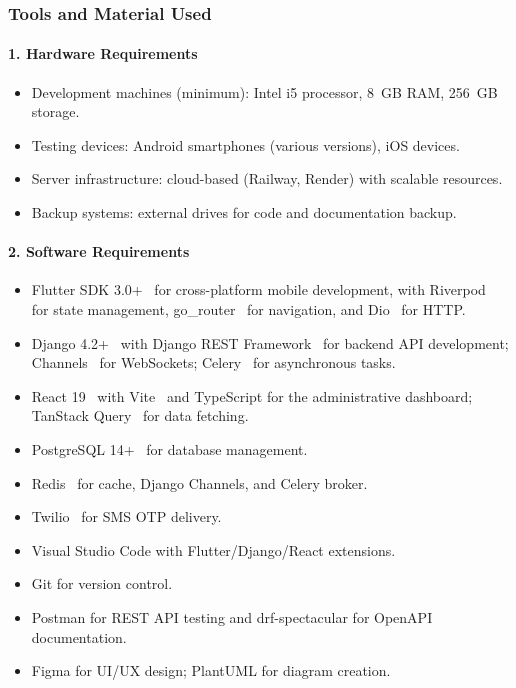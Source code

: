 \subsubsection*{Tools and Material Used}

\paragraph{1. Hardware Requirements}
\begin{itemize}
  \item Development machines (minimum): Intel i5 processor, 8~GB RAM, 256~GB storage.
  \item Testing devices: Android smartphones (various versions), iOS devices.
  \item Server infrastructure: cloud-based (Railway, Render) with scalable resources.
  \item Backup systems: external drives for code and documentation backup.
\end{itemize}

\paragraph{2. Software Requirements}
\begin{itemize}
  \item Flutter SDK 3.0+~\cite{flutter_docs} for cross-platform mobile development, with Riverpod~\cite{riverpod_docs} for state management, go\_router~\cite{gorouter_pkg} for navigation, and Dio~\cite{dio_pkg} for HTTP.
  \item Django 4.2+~\cite{django_docs} with Django REST Framework~\cite{drf_docs} for backend API development; Channels~\cite{channels_docs} for WebSockets; Celery~\cite{celery_docs} for asynchronous tasks.
  \item React 19~\cite{react_docs} with Vite~\cite{vite_docs} and TypeScript for the administrative dashboard; TanStack Query~\cite{tanstack_query} for data fetching.
  \item PostgreSQL 14+~\cite{postgres_docs} for database management.
  \item Redis~\cite{redis_docs} for cache, Django Channels, and Celery broker.
  \item Twilio~\cite{twilio_docs} for SMS OTP delivery.
  \item Visual Studio Code with Flutter/Django/React extensions.
  \item Git for version control.
  \item Postman for REST API testing and drf-spectacular for OpenAPI documentation.
  \item Figma for UI/UX design; PlantUML for diagram creation.
\end{itemize}

